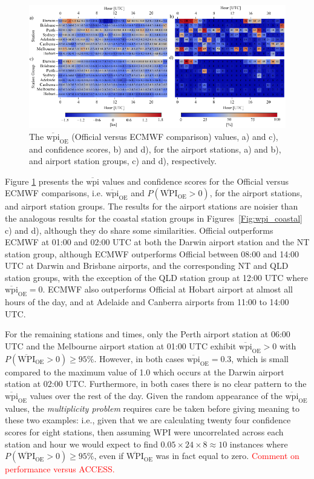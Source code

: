 \documentclass{ametsoc}
\begin{document}
\begin{figure}
\centering
\includegraphics[width=39pc]{airport_wpi.pdf}
\caption{The $\overline{\text{wpi}}_\text{OE}$ (Official versus ECMWF comparison) values, a) and c), and confidence scores, b) and d), for the airport stations, a) and b), and airport station groups, c) and d), respectively.}
\label{Fig:airport_wpi}
\end{figure}

Figure \ref{Fig:airport_wpi} presents the $\overline{\text{wpi}}$ values and confidence scores for the Official versus ECMWF comparisons, i.e. $\overline{\text{wpi}}_\text{OE}$ and $P\left(\overline{\text{WPI}}_\text{OE}>0\right)$, for the airport stations, and airport station groups. The results for the airport stations are noisier than the analogous results for the coastal station groups in Figures~\ref{Fig:wpi_coastal} c) and d), although they do share some similarities. Official outperforms ECMWF at 01:00 and 02:00 UTC at both the Darwin airport station and the NT station group, although ECMWF outperforms Official between 08:00 and 14:00 UTC at Darwin and Brisbane airports, and the corresponding NT and QLD station groups, with the exception of the QLD station group at 12:00 UTC where $\overline{\text{wpi}}_\text{OE} = 0$. ECMWF also outperforms Official at Hobart airport at almost all hours of the day, and at Adelaide and Canberra airports from 11:00 to 14:00 UTC. 

For the remaining stations and times, only the Perth airport station at 06:00 UTC and the Melbourne airport station at 01:00 UTC exhibit $\overline{\text{wpi}}_\text{OE}>0$ with $P\left(\overline{\text{WPI}}_\text{OE}>0\right)\geq 95\%$. However, in both cases $\overline{\text{wpi}}_\text{OE}=0.3$, which is small compared to the maximum value of 1.0 which occurs at the Darwin airport station at 02:00 UTC. Furthermore, in both cases there is no clear pattern to the $\overline{\text{wpi}}_\text{OE}$ values over the rest of the day. Given the random appearance of the $\overline{\text{wpi}}_\text{OE}$ values, the \textit{multiplicity problem} \citep[p. 178]{wilks11} requires care be taken before giving meaning to these two examples: i.e., given that we are calculating twenty four confidence scores for eight stations, then assuming WPI were uncorrelated across each station and hour we would expect to find $0.05 \times 24 \times 8 \approx 10$ instances where $P\left(\overline{\text{WPI}}_\text{OE}>0\right)\geq 95\%$, even if $\overline{\text{WPI}}_\text{OE}$ was in fact equal to zero. \textcolor{red}{Comment on performance versus ACCESS.}
\end{document}
